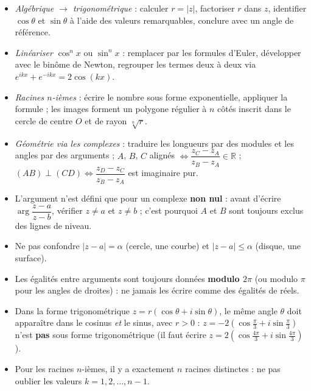 \documentclass[11pt]{article}
\newcommand{\cle}[1]{{\popxbold\color{popdark}#1}}
\begin{document}
\begin{methode}
\begin{itemize}
  \item \emph{Algébrique $\to$ trigonométrique} : calculer $r=|z|$, factoriser $r$ dans $z$, identifier $\cos\theta$ et $\sin\theta$ à l'aide des valeurs remarquables, conclure avec un angle de référence.
  \item \emph{Linéariser} $\cos^n x$ ou $\sin^n x$ : remplacer par les formules d'Euler, développer avec le binôme de Newton, regrouper les termes deux à deux via $e^{ikx}+e^{-ikx}=2\cos(kx)$.
  \item \emph{Racines $n$-ièmes} : écrire le nombre sous forme exponentielle, appliquer la formule ; les images forment un \cle{polygone régulier} à $n$ côtés inscrit dans le cercle de centre $O$ et de rayon $\sqrt[n]{r}$.
  \item \emph{Géométrie via les complexes} : traduire les longueurs par des modules et les angles par des arguments ; $A$, $B$, $C$ alignés $\Leftrightarrow \dfrac{z_C-z_A}{z_B-z_A}\in\mathbb{R}$ ; $(AB)\perp(CD) \Leftrightarrow \dfrac{z_D-z_C}{z_B-z_A}$ est imaginaire pur.
\end{itemize}
\end{methode}

\begin{attention}
\begin{itemize}
  \item L'argument n'est défini que pour un complexe \textbf{non nul} : avant d'écrire $\arg\dfrac{z-a}{z-b}$, vérifier $z\neq a$ et $z\neq b$ ; c'est pourquoi $A$ et $B$ sont toujours exclus des lignes de niveau.
  \item Ne pas confondre $|z-a|=\alpha$ (cercle, une courbe) et $|z-a|\leq\alpha$ (disque, une surface).
  \item Les égalités entre arguments sont toujours données \textbf{modulo $2\pi$} (ou modulo $\pi$ pour les angles de droites) : ne jamais les écrire comme des égalités de réels.
  \item Dans la forme trigonométrique $z=r(\cos\theta+i\sin\theta)$, le même angle $\theta$ doit apparaître dans le cosinus \emph{et} le sinus, avec $r>0$ : $z=-2\left(\cos\frac{\pi}{3}+i\sin\frac{\pi}{3}\right)$ n'est \textbf{pas} sous forme trigonométrique (il faut écrire $z=2\left(\cos\frac{4\pi}{3}+i\sin\frac{4\pi}{3}\right)$).
  \item Pour les racines $n$-ièmes, il y a exactement $n$ racines distinctes : ne pas oublier les valeurs $k=1,2,\dots,n-1$.
\end{itemize}
\end{attention}
\end{document}
